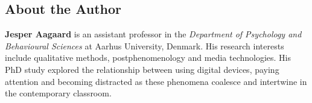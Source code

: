    \fadebreak{}
\subsection{About the Author}
\label{paper4:colophon}

\textbf{Jesper Aagaard} is an assistant professor in the \textit{Department of Psychology and Behavioural Sciences} at Aarhus University, Denmark. His research interests include qualitative methods, postphenomenology and media technologies. His PhD study explored the relationship between using digital devices, paying attention and becoming distracted as these phenomena coalesce and intertwine in the contemporary classroom.